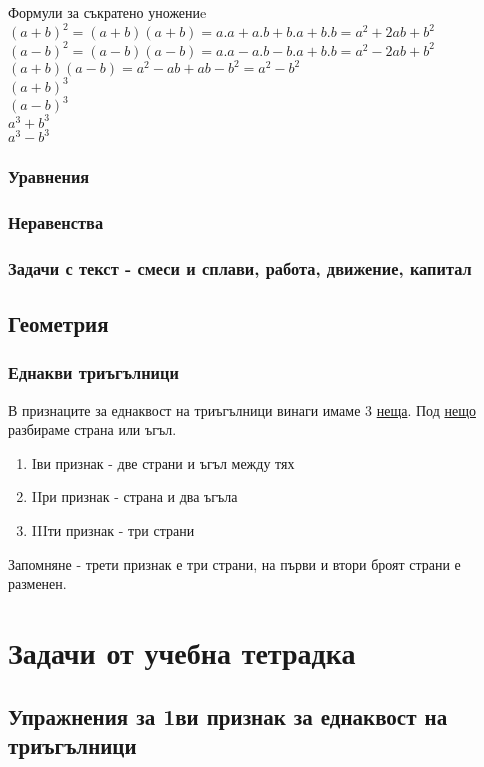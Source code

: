\documentclass{article}
\begin{document}
	Формули за съкратено уножениe \\
	$(a+b)^2 = (a+b)(a+b)=a.a + a.b + b.a + b.b = a^2 + 2ab + b^2 $ \\
	$(a-b)^2 = (a-b)(a-b)=a.a - a.b - b.a + b.b = a^2 - 2ab + b^2 $\\
	$(a+b)(a-b)= a^2 - ab + ab - b^2 = a^2 - b^2 $\\	
	$(a+b)^3 $\\
	$(a-b)^3 $\\
	$a^3 + b^3 $\\
	$a^3 - b^3 $
	
	\subsubsection{Уравнения}
	\subsubsection{Неравенства}
	\subsubsection{Задачи с текст - смеси и сплави, работа, движение, капитал}
	\subsection{Геометрия}
	\subsubsection{Еднакви триъгълници}
	В признаците за еднаквост на триъгълници винаги имаме 3 \underline{неща}. Под \underline{нещо} разбираме страна или ъгъл. 
	\begin{enumerate}
		\item Iви признак - две страни и ъгъл между тях
		\item IIри признак - страна и два ъгъла
		\item IIIти признак - три страни
	\end{enumerate}
	Запомняне - трети признак е три страни, на първи и втори броят страни е разменен.
\section{Задачи от учебна тетрадка}
\subsection{Упражнения за 1ви признак за еднаквост на триъгълници }	
\end{document}

